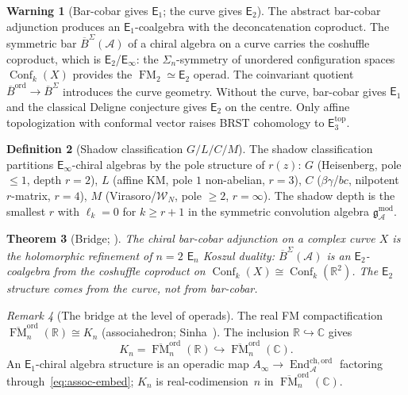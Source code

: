 \documentclass[11pt,reqno]{amsart}
\newtheorem{theorem}{Theorem}[section]
\theoremstyle{definition}
\newtheorem{definition}[theorem]{Definition}
\newtheorem{warning}[theorem]{Warning}
\theoremstyle{remark}
\newtheorem{remark}[theorem]{Remark}
\newcommand{\cA}{\mathcal{A}}
\newcommand{\cW}{\mathcal{W}}
\newcommand{\Ainf}{A_{\infty}}
\newcommand{\Eone}{\mathsf{E}_{1}}
\newcommand{\Etwo}{\mathsf{E}_{2}}
\providecommand{\Ethree}{\mathsf{E}_{3}}
\newcommand{\En}{\mathsf{E}_{n}}
\newcommand{\Einf}{\mathsf{E}_{\infty}}
\DeclareMathOperator{\End}{End}
\DeclareMathOperator{\Conf}{Conf}
\DeclareMathOperator{\FM}{FM}
\newcommand{\gmod}{\mathfrak{g}^{\mathrm{mod}}_{\cA}}
\newcommand{\Barord}{\overline{B}^{\mathrm{ord}}}
\newcommand{\BarSig}{\overline{B}^{\Sigma}}
\newcommand{\CC}{\mathbb{C}}
\newcommand{\RR}{\mathbb{R}}
\numberwithin{equation}{section}
\begin{document}
\begin{warning}[Bar-cobar gives $\Eone$; the curve gives $\Etwo$]
\label{warn:e1-vs-e2-source}
The abstract bar-cobar adjunction produces an
$\Eone$-coalgebra with the deconcatenation coproduct.
The symmetric bar $\BarSig(\cA)$ of a chiral algebra on a
curve carries the coshuffle coproduct, which is
$\Etwo$/$\Einf$: the $\Sigma_n$-symmetry of unordered
configuration spaces $\Conf_k(X)$ provides the
$\FM_2 \simeq \Etwo$ operad. The coinvariant quotient
$\Barord \to \BarSig$ introduces the curve geometry.
Without the curve, bar-cobar gives $\Eone$ and the
classical Deligne conjecture gives $\Etwo$ on the centre.
Only affine topologization with conformal vector raises
BRST cohomology to $\Ethree^{\mathrm{top}}$.
\end{warning}

\begin{definition}[Shadow classification $G/L/C/M$]
\label{def:glcm}
The shadow classification~\cite[\S II]{Lorgat26I} partitions
$\Einf$-chiral algebras by the pole structure of $r(z)$:
$G$ (Heisenberg, pole $\leq 1$, depth $r{=}2$),
$L$ (affine KM, pole $1$ non-abelian, $r{=}3$),
$C$ ($\beta\gamma$/$bc$, nilpotent $r$-matrix, $r{=}4$),
$M$ (Virasoro/$\cW_N$, pole $\geq 2$, $r{=}\infty$).
The shadow depth is the smallest $r$ with
$\ell_k = 0$ for $k \geq r{+}1$ in the symmetric
convolution algebra $\gmod$.
\end{definition}

\begin{theorem}[Bridge; {\cite[Theorem~1.1(ii)]{Lorgat26I}}]
\label{thm:bridge}
The chiral bar-cobar adjunction on a complex curve $X$
is the holomorphic refinement of $n{=}2$ $\En$ Koszul
duality: $\BarSig(\cA)$ is an $\Etwo$-coalgebra from
the coshuffle coproduct on $\Conf_k(X) \cong \Conf_k(\RR^2)$.
The $\Etwo$ structure comes from the curve, not from
bar-cobar.
\end{theorem}

\begin{remark}[The bridge at the level of operads]
\label{rem:bridge-operads}
The real FM compactification
$\overline{\FM}_n^{\mathrm{ord}}(\RR) \cong K_n$
(associahedron; Sinha~\cite{Sinha04}). The inclusion
$\RR \hookrightarrow \CC$ gives
\begin{equation}\label{eq:assoc-embed}
  K_n = \overline{\FM}_n^{\mathrm{ord}}(\RR)
  \hookrightarrow
  \overline{\FM}_n^{\mathrm{ord}}(\CC).
\end{equation}
An $\Eone$-chiral algebra structure is an operadic map
$\Ainf \to \End^{\mathrm{ch,ord}}_\cA$ factoring
through~\eqref{eq:assoc-embed}; $K_n$ is
real-codimension~$n$ in
$\overline{\FM}_n^{\mathrm{ord}}(\CC)$.
\end{remark}
\end{document}
